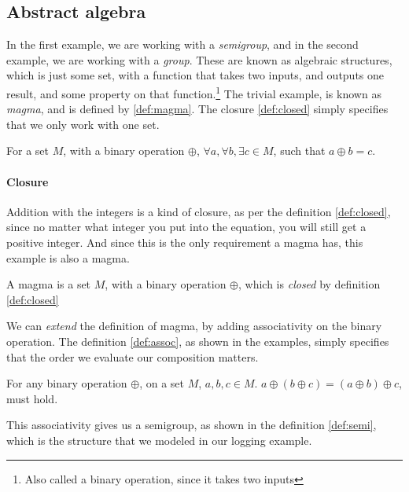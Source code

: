 \subsection{Abstract algebra}

In the first example, we are working with a \textit{semigroup}, and in the
second example, we are working with a \textit{group}. These are known as
algebraic structures, which is just some set, with a function that takes two
inputs, and outputs one result, and some property on that function.\footnote{Also called a binary operation, since it takes two inputs}
The trivial example, is known as \textit{magma}, and is defined by
\ref{def:magma}. The closure \ref{def:closed} simply specifies that we only work
with one set.

\begin{definition}[Closure] \label{def:closed}
  For a set $M$, with a binary operation $\oplus$,
  $\forall a, \forall b, \exists c \in M$, such that
  $a \oplus b = c$.
\end{definition}

\paragraph{Closure} Addition with the integers is a kind of closure, as per the
definition \ref{def:closed}, since no matter what integer you put into the
equation, you will still get a positive integer. And since this is the only
requirement a magma has, this example is also a magma.

\begin{definition}[Magma] \label{def:magma}
  A magma is a set $M$, with a binary operation $\oplus$, which is
  \textit{closed} by definition \ref{def:closed}
\end{definition}

We can \textit{extend} the definition of magma, by adding associativity on the
binary operation. The definition \ref{def:assoc}, as shown in the examples,
simply specifies that the order we evaluate our composition matters.

\begin{definition} \label{def:assoc}
  For any binary operation $\oplus$, on a set $M$, $a, b, c \in M$.
  $a \oplus \left ( b \oplus c \right ) = \left ( a \oplus b \right ) \oplus c$,
  must hold.
\end{definition}

This associativity gives us a semigroup, as shown in the definition
\ref{def:semi}, which is the structure that we modeled in our logging example.

